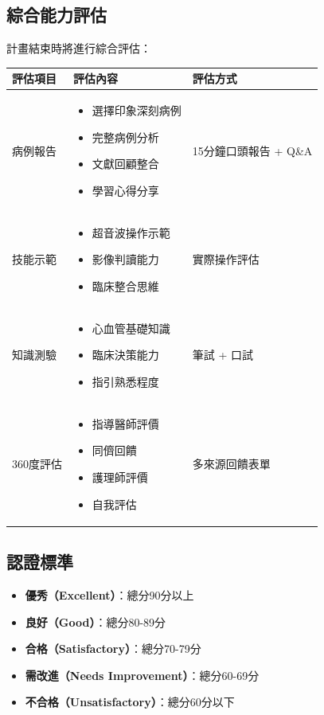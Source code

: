 \documentclass[12pt,a4paper]{article}
\begin{document}
\subsection{綜合能力評估}
計畫結束時將進行綜合評估：

\begin{longtable}{|>{\raggedright\arraybackslash}p{4cm}|>{\raggedright\arraybackslash}p{6cm}|>{\raggedright\arraybackslash}p{4cm}|}
\hline
\rowcolor{light_orange}
\textbf{評估項目} & \textbf{評估內容} & \textbf{評估方式} \\
\hline
病例報告 & 
\begin{itemize}[nosep]
\item 選擇印象深刻病例
\item 完整病例分析
\item 文獻回顧整合
\item 學習心得分享
\end{itemize} & 
15分鐘口頭報告 + Q\&A \\
\hline
技能示範 & 
\begin{itemize}[nosep]
\item 超音波操作示範
\item 影像判讀能力
\item 臨床整合思維
\end{itemize} & 
實際操作評估 \\
\hline
知識測驗 & 
\begin{itemize}[nosep]
\item 心血管基礎知識
\item 臨床決策能力
\item 指引熟悉程度
\end{itemize} & 
筆試 + 口試 \\
\hline
360度評估 & 
\begin{itemize}[nosep]
\item 指導醫師評價
\item 同儕回饋
\item 護理師評價
\item 自我評估
\end{itemize} & 
多來源回饋表單 \\
\hline
\end{longtable}

\subsection{認證標準}
\begin{itemize}[nosep]
    \item \textbf{優秀（Excellent）}：總分90分以上
    \item \textbf{良好（Good）}：總分80-89分
    \item \textbf{合格（Satisfactory）}：總分70-79分
    \item \textbf{需改進（Needs Improvement）}：總分60-69分
    \item \textbf{不合格（Unsatisfactory）}：總分60分以下
\end{itemize}
\end{document}
